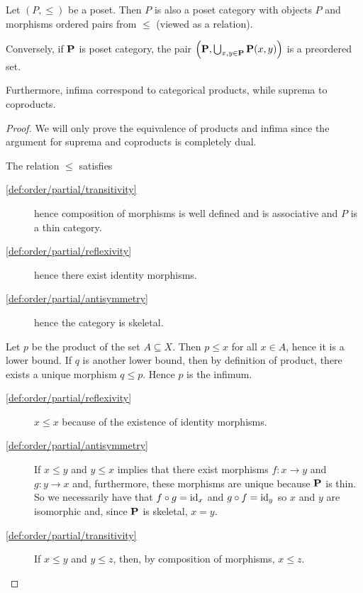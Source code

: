 \begin{proposition}\label{thm:poset_iff_poset_category}
  Let \( (P, \leq) \) be a poset. Then \( P \) is also a poset category with objects \( P \) and morphisms ordered pairs from \( \leq \) (viewed as a relation).

  Conversely, if \( \operatorname{\mathbf{P}} \) is poset category, the pair \( \left(\operatorname{\mathbf{P}}, \bigcup_{x, y \in \operatorname{\mathbf{P}}} \operatorname{\mathbf{P}}(x, y) \right) \) is a preordered set.

  Furthermore, infima correspond to categorical products, while suprema to coproducts.
\end{proposition}
\begin{proof}
  We will only prove the equivalence of products and infima since the argument for suprema and coproducts is completely dual.

  \begin{description}
    \Implies The relation \( \leq \) satisfies
    \begin{description}
      \item[\ref{def:order/partial/transitivity}] hence composition of morphisms is well defined and is associative and \( P \) is a thin category.
      \item[\ref{def:order/partial/reflexivity}] hence there exist identity morphisms.
      \item[\ref{def:order/partial/antisymmetry}] hence the category is skeletal.
    \end{description}

    Let \( p \) be the product of the set \( A \subseteq X \). Then \( p \leq x \) for all \( x \in A \), hence it is a lower bound. If \( q \) is another lower bound, then by definition of product, there exists a unique morphism \( q \leq p \). Hence \( p \) is the infimum.

    \ImpliedBy\mbox{}
    \begin{description}
      \item[\ref{def:order/partial/reflexivity}] \( x \leq x \) because of the existence of identity morphisms.
      \item[\ref{def:order/partial/antisymmetry}] If \( x \leq y \) and \( y \leq x \) implies that there exist morphisms \( f: x \to y \) and \( g: y \to x \) and, furthermore, these morphisms are unique because \( \operatorname{\mathbf{P}} \) is thin. So we necessarily have that \( f \circ g = \operatorname{id}_x \) and \( g \circ f = \operatorname{id}_y \) so \( x \) and \( y \) are isomorphic and, since \( \operatorname{\mathbf{P}} \) is skeletal, \( x = y \).
      \item[\ref{def:order/partial/transitivity}] If \( x \leq y \) and \( y \leq z \), then, by composition of morphisms, \( x \leq z \).
    \end{description}


\end{description}
\end{proof}
